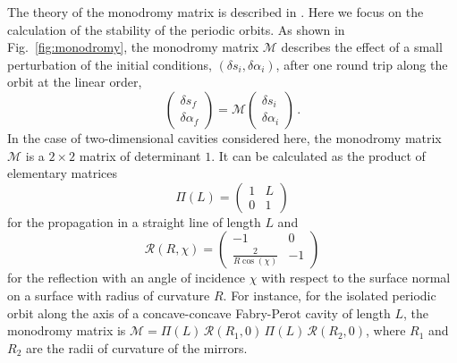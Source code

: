 \documentclass[10pt]{iopart}
\begin{document}
The theory of the monodromy matrix is described in \cite{brack,bogomolny-2003}. Here we focus on the calculation of the stability of the periodic orbits. As shown in Fig.~\ref{fig:monodromy}, the monodromy matrix $\mathcal{M}$ describes the effect of a small perturbation of the initial conditions, $(\delta s_i, \delta \alpha_i)$, after one round trip along the orbit at the linear order,
\begin{equation}
\left( \begin{array}{c} \delta s_f \\ \delta \alpha_f \end{array} \right) = \mathcal{M} \left( \begin{array}{c} \delta s_i \\ \delta \alpha_i \end{array} \right) \, .
\end{equation}
In the case of two-dimensional cavities considered here, the monodromy matrix $\mathcal{M}$ is a $2 \times 2$ matrix of determinant $1$. It can be calculated as the product of elementary matrices
\begin{equation}
\Pi(L) = \left( \begin{array}{cc} 1 & L\\
0 & 1\end{array} \right)
\end{equation}
for the propagation in a straight line of length $L$ and
\begin{equation}
\mathcal{R}(R, \chi) = \left( \begin{array}{cc} -1 & 0 \\
\frac{2}{R \cos(\chi)} & -1 \end{array} \right)
\end{equation}
for the reflection with an angle of incidence $\chi$ with respect to the surface normal on a surface with radius of curvature $R$. For instance, for the isolated periodic orbit along the axis of a concave-concave Fabry-Perot cavity of length $L$, the monodromy matrix is $\mathcal{M} = \Pi(L) \, \mathcal{R}(R_1,0) \, \Pi(L) \, \mathcal{R}(R_2,0)$, where $R_1$ and $R_2$ are the radii of curvature of the mirrors. %
\end{document}
